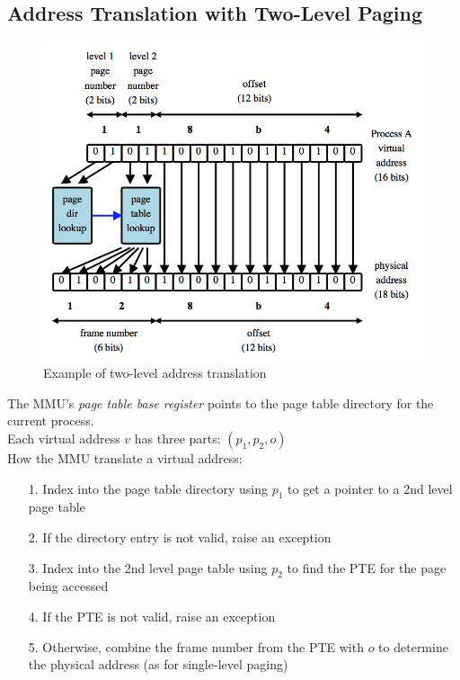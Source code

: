\documentclass[12pt]{article}
\theoremstyle{plain}
\theoremstyle{definition}
\begin{document}
\subsection{Address Translation with Two-Level Paging}
\begin{figure}[H]
  \centering
  \includegraphics[scale=0.7]{pictures/two_level_paing_trans.png}
  \caption{Example of two-level address translation}
  \label{fig:two_level_addr_translation}
\end{figure}
The MMU's \emph{page table base register} points to the page table directory for the current process. \\
Each virtual address $v$ has three parts: $(p_{1}, p_{2}, o)$ \\
How the MMU translate a virtual address:
\begin{enumerate}
  \item[1.] Index into the page table directory using $p_{1}$ to get a pointer to a 2nd level page table
  \item[2.] If the directory entry is not valid, raise an exception
  \item[3.] Index into the 2nd level page table using $p_{2}$ to find the PTE for the page being accessed
  \item[4.] If the PTE is not valid, raise an exception
  \item[5.] Otherwise, combine the frame number from the PTE with $o$ to determine the physical address (as for single-level paging)
\end{enumerate}
\end{document}
